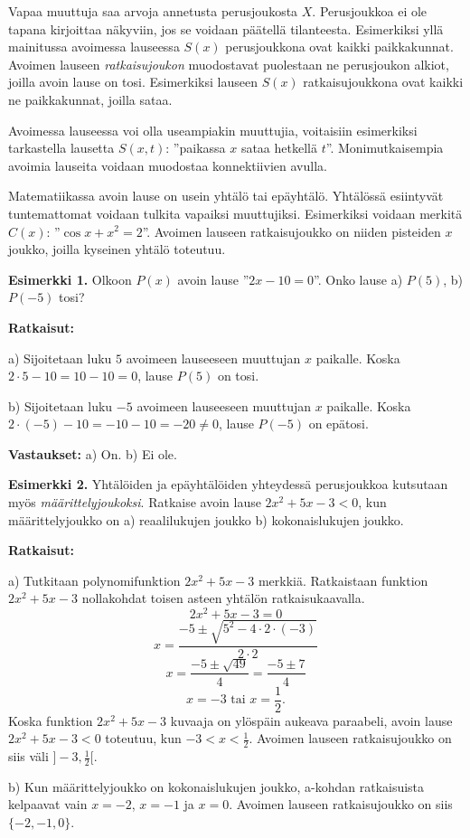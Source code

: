 Vapaa muuttuja saa arvoja annetusta perusjoukosta $X$. Perusjoukkoa ei ole tapana kirjoittaa näkyviin, jos se voidaan päätellä tilanteesta. Esimerkiksi yllä mainitussa avoimessa lauseessa $S(x)$ perusjoukkona ovat kaikki paikkakunnat. Avoimen lauseen {\em ratkaisujoukon} muodostavat puolestaan ne perusjoukon alkiot, joilla avoin lause on tosi. Esimerkiksi lauseen $S(x)$ ratkaisujoukkona ovat kaikki ne paikkakunnat, joilla sataa.

Avoimessa lauseessa voi olla useampiakin muuttujia, voitaisiin esimerkiksi tarkastella lausetta $S(x,t)$: ''paikassa $x$ sataa hetkellä $t$''. Monimutkaisempia avoimia lauseita voidaan muodostaa konnektiivien
avulla.

Matematiikassa avoin lause on usein yhtälö tai epäyhtälö. Yhtälössä esiintyvät tuntemattomat voidaan tulkita vapaiksi muuttujiksi. Esimerkiksi voidaan merkitä $C(x)$: ''$\cos x + x^2= 2$''. Avoimen lauseen ratkaisujoukko on niiden pisteiden $x$ joukko, joilla kyseinen yhtälö toteutuu.


{\bf Esimerkki 1.} Olkoon $P(x)$ avoin lause ''$2x - 10 = 0$''. Onko lause a) $P(5)$, b) $P(-5)$ tosi?

{\bf Ratkaisut:}

a) Sijoitetaan luku $5$ avoimeen lauseeseen muuttujan $x$ paikalle. Koska $2\cdot 5 - 10 = 10 - 10 = 0$, lause $P(5)$ on tosi.

b) Sijoitetaan luku $-5$ avoimeen lauseeseen muuttujan $x$ paikalle. Koska $2\cdot(-5) - 10 = -10 - 10 = -20 \neq 0$, lause $P(-5)$ on epätosi.

{\bf Vastaukset:} a) On. b) Ei ole.

{\bf Esimerkki 2.} Yhtälöiden ja epäyhtälöiden yhteydessä perusjoukkoa kutsutaan myös {\em määrittelyjoukoksi}. Ratkaise avoin lause $2x^2 + 5x - 3 < 0$, kun määrittelyjoukko on a) reaalilukujen joukko b) kokonaislukujen joukko.

{\bf Ratkaisut:}

a) Tutkitaan polynomifunktion $2x^2 + 5x - 3$ merkkiä. Ratkaistaan funktion $2x^2 + 5x - 3$ nollakohdat toisen asteen yhtälön ratkaisukaavalla.
\[
2x^2 + 5x - 3 = 0
\]
\[
x =\frac{-5\pm\sqrt{5^2-4\cdot 2\cdot(-3)}}{2\cdot 2}
\] 
\[
x = \frac{-5\pm\sqrt{49}}{4} =\frac{-5\pm 7}{4}
\]
\[
x = -3\textrm{  tai  }x =\frac{1}{2}.
\]
Koska funktion $2x^2 + 5x - 3$ kuvaaja on ylöspäin aukeava paraabeli, avoin lause $2x^2 + 5x - 3 < 0$ toteutuu, kun $-3 < x < \frac{1}{2}$. Avoimen lauseen ratkaisujoukko on siis väli $]-3, \frac{1}{2}[$.

b) Kun määrittelyjoukko on kokonaislukujen joukko, a-kohdan ratkaisuista kelpaavat vain $x = -2$, $x = -1$ ja $x = 0$. Avoimen lauseen ratkaisujoukko on siis $\{-2, -1, 0\}$.

